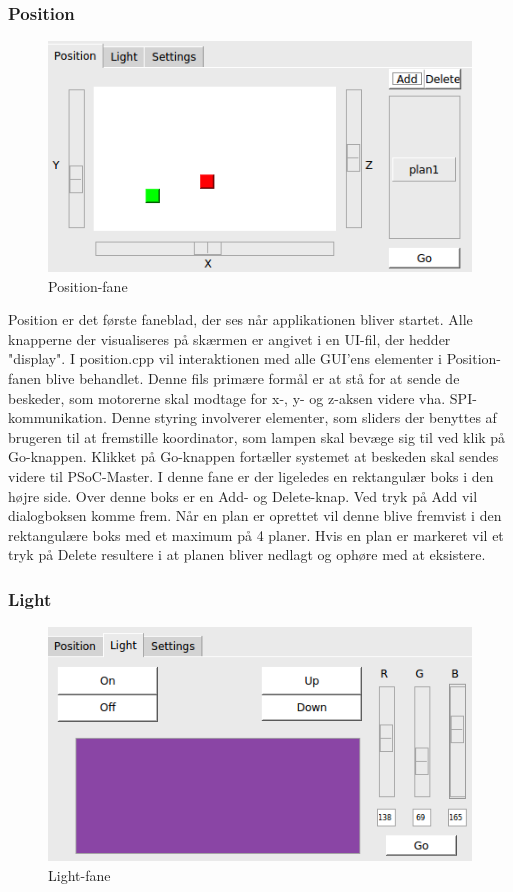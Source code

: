 \subsubsection{Position}

\begin{figure}[H]
\centering
\includegraphics[width=0.9\linewidth]{0_Filer/Figuer/Position.png}
\caption{Position-fane}
\label{fig:GUI Position}
\end{figure}

Position er det første faneblad, der ses når applikationen bliver startet. Alle knapperne der visualiseres på skærmen er angivet i en UI-fil, der hedder "display". I position.cpp vil interaktionen med alle GUI’ens elementer i Position-fanen blive behandlet. Denne fils primære formål er at stå for at sende de beskeder, som motorerne skal modtage for x-, y- og z-aksen videre vha. SPI-kommunikation. Denne styring involverer elementer, som sliders der benyttes af brugeren til at fremstille koordinator, som lampen skal bevæge sig til ved klik på Go-knappen. Klikket på Go-knappen fortæller systemet at beskeden skal sendes videre til PSoC-Master. I denne fane er der ligeledes en rektangulær boks i den højre side. Over denne boks er en Add- og Delete-knap. Ved tryk på Add vil dialogboksen komme frem. Når en plan er oprettet vil denne blive fremvist i den rektangulære boks med et maximum på 4 planer. Hvis en plan er markeret vil et tryk på Delete resultere i at planen bliver nedlagt og ophøre med at eksistere.

\subsubsection{Light}

\begin{figure}[H]
\centering
\includegraphics[width=0.9\linewidth]{0_Filer/Figuer/Light.png}
\caption{Light-fane}
\label{fig:GUI Light}
\end{figure}

